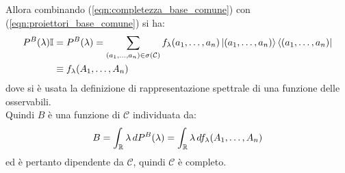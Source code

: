 \documentclass[../../FisicaTeorica.tex]{subfiles}
\begin{document}
Allora combinando (\ref{eqn:completezza_base_comune}) con (\ref{eqn:proiettori_base_comune}) si ha:
\begin{align*}
P^B(\lambda)\mathbb{I} &= P^B(\lambda)=\sum_{(a_1, \dots, a_n)\in \sigma(\mathcal{C})} f_\lambda(a_1, \dots, a_n)\ket{(a_1, \dots, a_n)}\bra{(a_1, \dots, a_n)}\\ 
&\equiv f_\lambda(A_1,\dots, A_n)
\end{align*} %
dove si è usata la definizione di rappresentazione spettrale di una funzione delle osservabili.\\
Quindi $B$ è una funzione di $\mathcal{C}$ individuata da:
\[
B=\int_{\mathbb{R}} \lambda\,dP^B(\lambda) =\int_{\mathbb{R}} \lambda\,df_\lambda(A_1,\dots, A_n)
\] 
ed è pertanto dipendente da $\mathcal{C}$, quindi $\mathcal{C}$ è completo.\\
\end{document}
